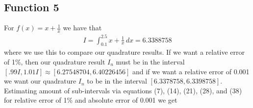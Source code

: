 \documentclass[12pt]{article}
\theoremstyle{remark}
\begin{document}
\newpage

\subsection{Function 5}

For $f(x) = x + \frac{1}{x}$ we have that
\begin{align} 
I = \int_{0.1}^{2.5} x + \frac{1}{x}\, dx = 6.3388758
\end{align}
where we use this to compare our quadrature results. If we want a relative error of 1\%, then our quadrature result $I_n$ must be in the interval $[.99I, 1.01I] \approx [6.27548704, 6.40226456]$ and if we want a relative error of 0.001 we want our quadrature $I_n$ to be in the interval $[6.3378758,6.3398758]$. Estimating amount of sub-intervals via equations (7), (14), (21), (28), and (38) for relative error of 1\% and absolute error of 0.001 we get
\end{document}
